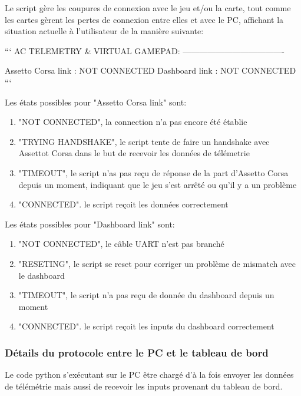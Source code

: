 \documentclass[french, 11pt]{article}
\begin{document}
		Le script gère les coupures de connexion avec le jeu et/ou la carte, tout comme les cartes gèrent les pertes de connexion entre elles et avec le PC, affichant la situation actuelle à l'utilisateur de la manière suivante:

		```
		AC TELEMETRY & VIRTUAL GAMEPAD:
		-------------------------------------

		Assetto Corsa link : NOT CONNECTED                         
		Dashboard link     : NOT CONNECTED   
		```

		Les états possibles pour "Assetto Corsa link" sont:

		\begin{enumerate}
			\item "NOT CONNECTED", la connection n'a pas encore été établie
			\item "TRYING HANDSHAKE", le script tente de faire un handshake avec Assettot Corsa dans le but de recevoir les données de télémetrie
			\item "TIMEOUT", le script n'as pas reçu de réponse de la part d'Assetto Corsa depuis un moment, indiquant que le jeu s'est arrêté ou qu'il y a un problème
			\item "CONNECTED". le script reçoit les données correctement
		\end{enumerate}

		Les états possibles pour "Dashboard link" sont: 

		\begin{enumerate}
			\item "NOT CONNECTED", le câble UART n'est pas branché
			\item "RESETING", le script se reset pour corriger un problème de mismatch avec le dashboard 
			\item "TIMEOUT", le script n'a pas reçu de donnée du dashboard depuis un moment
			\item "CONNECTED". le script reçoit les inputs du dashboard correctement
		\end{enumerate}


		\subsubsection{Détails du protocole entre le PC et le tableau de bord}
		\label{telemetrie}

			Le code python s'exécutant sur le PC être chargé d'à la fois envoyer les données de télémétrie mais aussi de recevoir les inputs provenant du tableau de bord.
\end{document}
